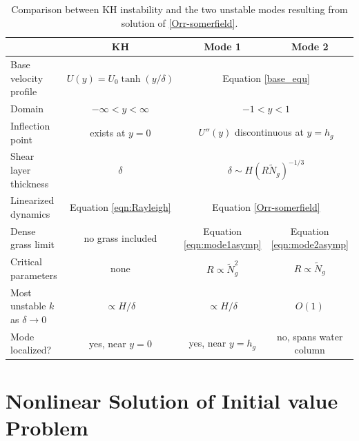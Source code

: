 \documentclass[12pt]{report}   %
\newcommand{\hg}{h_g}
\newcommand{\Rey}{{R}}
\newcommand{\Ndg}{\tilde{N}_g}
\begin{document}
%
\begin{table}
{}  %
\renewcommand{\arraystretch}{1.2}
 \begin{tabular}{l|c|c|c}
			& KH 				& Mode 1 		& Mode 2 \\ \hline
 Base velocity profile 	& $U(y) = U_0 \tanh(y/\delta)$			& \multicolumn{2}{c}{Equation \eqref{base_equ}} \\
 Domain 		& $-\infty < y < \infty$			& \multicolumn{2}{c}{$-1<y<1$} \\
 Inflection point	& exists at $y=0$				& \multicolumn{2}{c}{$U''(y)$ discontinuous at $y=\hg$} \\
 Shear layer thickness	& $\delta$					& \multicolumn{2}{c}{$\delta \sim  H\left(\Rey \Ndg \right)^{-1/3}$} \\
 Linearized dynamics	& Equation \eqref{eqn:Rayleigh}		& \multicolumn{2}{c}{Equation \eqref{Orr-somerfield}} \\
 Dense grass limit &  no grass included & Equation \eqref{eqn:mode1asymp} & Equation \eqref{eqn:mode2asymp}  \\
 Critical parameters	& none						& $\Rey \propto \Ndg^{2}$ 	& $\Rey \propto \Ndg$ \\
 Most unstable $k$ as $\delta \to 0$	& $\propto H/\delta$		& $\propto H/\delta$	& $O(1)$ \\
 Mode localized?	& yes, near $y=0$				& yes, near $y=\hg$			& no, spans water column
 \end{tabular}
 \caption{Comparison between KH instability and the two unstable modes resulting from solution of \ref{Orr-somerfield}.}
 \label{tab:comparison}
\end{table}
\clearpage{\pagestyle{empty}\cleardoublepage}




\chapter{Nonlinear Solution of Initial value Problem}
\end{document}
